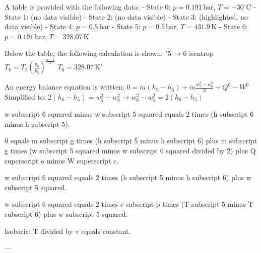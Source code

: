 A table is provided with the following data:  
- State 0: \( p = 0.191 \, \text{bar} \), \( T = -30^\circ \text{C} \)  
- State 1: (no data visible)  
- State 2: (no data visible)  
- State 3: (highlighted, no data visible)  
- State 4: \( p = 0.5 \, \text{bar} \)  
- State 5: \( p = 0.5 \, \text{bar} \), \( T = 431.9 \, \text{K} \)  
- State 6: \( p = 0.191 \, \text{bar} \), \( T = 328.07 \, \text{K} \)  

Below the table, the following calculation is shown:  
"5 → 6 isentrop  
\( T_6 = T_5 \left( \frac{p_6}{p_5} \right)^{\frac{n-1}{n}} \)  
\( T_6 = 328.07 \, \text{K} \)"  

An energy balance equation is written:  
\( 0 = \dot{m} (h_5 - h_6) + \dot{m} \frac{w_5^2 - w_6^2}{2} + Q^0 - W^0 \)  
Simplified to:  
\( 2 (h_6 - h_5) = w_5^2 - w_6^2 \rightarrow w_6^2 - w_5^2 = 2 (h_6 - h_5) \)

w subscript 6 squared minus w subscript 5 squared equals 2 times (h subscript 6 minus h subscript 5).  

0 equals m subscript g times (h subscript 5 minus h subscript 6) plus m subscript g times (w subscript 5 squared minus w subscript 6 squared divided by 2) plus Q superscript o minus W superscript c.  

w subscript 6 squared equals 2 times (h subscript 5 minus h subscript 6) plus w subscript 5 squared.  

w subscript 6 squared equals 2 times c subscript p times (T subscript 5 minus T subscript 6) plus w subscript 5 squared.  

Isobaric: T divided by v equals constant.  

---